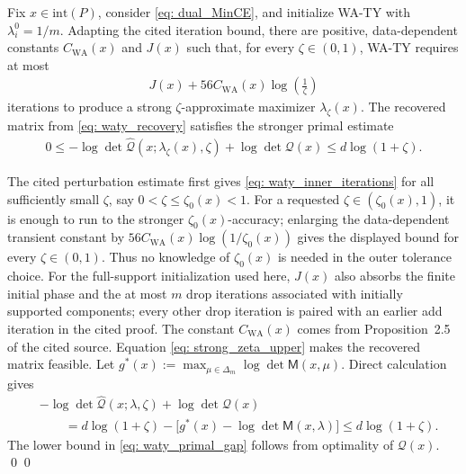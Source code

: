 \documentclass[smallextended]{svjour3}
\let\springerproof\proof
\let\endspringerproof\endproof
\renewenvironment{proof}{\springerproof}{%
  \ifhmode\qed\else\leavevmode\qed\fi\endspringerproof}
\newcommand{\wh}{\widehat}
\begin{document}
\begin{theorem}{\cite[Proposition~2.5 and Theorem~2.6(a)]{ahipasaoglu2008fw}}\label{thm: waty_fixed_instance}
    Fix $x\in \mathrm{int}(P)$, consider \eqref{eq: dual_MinCE}, and initialize WA-TY with $\lambda_i^0=1/m$. Adapting the cited iteration bound, there are
    positive, data-dependent constants $C_{\mathrm{WA}}(x)$ and $J(x)$ such that, for every
    $\zeta\in(0,1)$, WA-TY requires at most
    \begin{align}\label{eq: waty_inner_iterations}
        J(x)+56C_{\mathrm{WA}}(x)\log\left(\frac{1}{\zeta}\right)
    \end{align}
    iterations to produce a strong $\zeta$-approximate maximizer
    $\lambda_\zeta(x)$. The recovered matrix from
    \eqref{eq: waty_recovery} satisfies the stronger primal estimate
    \begin{align}\label{eq: waty_primal_gap}
        0
        \leq
        -\log\det \wh{\mathcal{Q}}(x;\lambda_\zeta(x),\zeta)
        +\log\det \mathcal{Q}(x)
        \leq d\log(1+\zeta).
    \end{align}
\end{theorem}
\begin{proof}
    The cited perturbation estimate first gives
    \eqref{eq: waty_inner_iterations} for all sufficiently small $\zeta$, say
    $0<\zeta\leq\zeta_0(x)<1$. For a requested
    $\zeta\in(\zeta_0(x),1)$, it is enough to run to the stronger
    $\zeta_0(x)$-accuracy; enlarging the data-dependent transient constant by
    $56C_{\mathrm{WA}}(x)\log(1/\zeta_0(x))$ gives the displayed bound for every
    $\zeta\in(0,1)$. Thus no knowledge of $\zeta_0(x)$ is needed in the outer
    tolerance choice. For the full-support initialization used here, $J(x)$ also absorbs the finite initial phase and the at most $m$ drop iterations associated with initially supported components; every other drop iteration is paired with an earlier add iteration in the cited proof. The constant $C_{\mathrm{WA}}(x)$ comes from Proposition~2.5 of the
    cited source. Equation \eqref{eq: strong_zeta_upper} makes the recovered
    matrix feasible. Let $g^*(x):=\max_{\mu\in\Delta_m}\log\det\mathsf M(x,\mu).$
    Direct calculation gives
    \begin{align*}
        &-\log\det \wh{\mathcal Q}(x;\lambda,\zeta)
        +\log\det\mathcal Q(x)\\
        &\qquad=d\log(1+\zeta)
        -\bigl[g^*(x)-\log\det\mathsf M(x,\lambda)\bigr] \leq d\log(1+\zeta).
    \end{align*}
    The lower bound in \eqref{eq: waty_primal_gap} follows from optimality of
    $\mathcal Q(x)$.
\end{proof}
\end{document}
